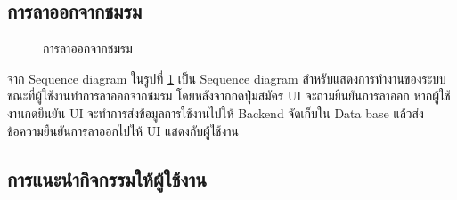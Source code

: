 \documentclass[14pt,oneside,openright,a4paper]{cpe-thai-project}
\begin{document}
\newpage

\subsection{การลาออกจากชมรม}

  \begin{figure}[!h]\centering
    \setlength{\fboxrule}{0.5mm} %
    \setlength{\fboxsep}{0.5cm}
    \caption{การลาออกจากชมรม}\label{fig:Club resignation}
  \end{figure}

  จาก Sequence diagram ในรูปที่ \ref{fig:Club resignation} เป็น Sequence diagram สำหรับแสดงการทำงานของระบบขณะที่ผู้ใช้งานทำการลาออกจากชมรม โดยหลังจากกดปุ่มสมัคร UI จะถามยืนยันการลาออก หากผู้ใช้งานกดยืนยัน UI จะทำการส่งข้อมูลการใช้งานไปให้ Backend จัดเก็บใน Data base แล้วส่งข้อความยืนยันการลาออกไปให้ UI แสดงกับผู้ใช้งาน

\newpage

\subsection{การแนะนำกิจกรรมให้ผู้ใช้งาน}
\end{document}
